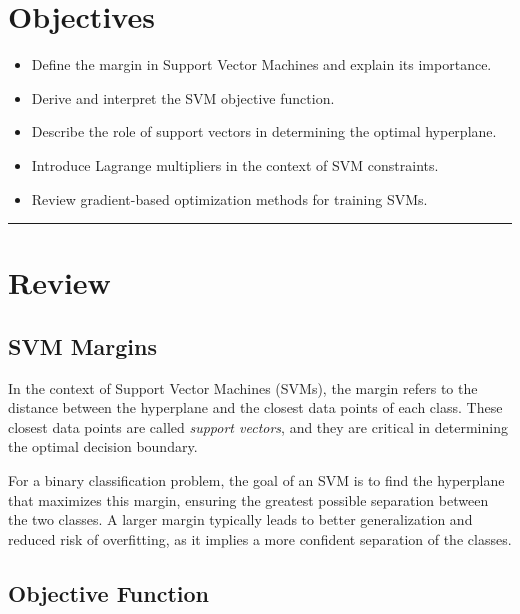 \section*{Objectives}
\begin{itemize}
    \item Define the margin in Support Vector Machines and explain its importance.
    \item Derive and interpret the SVM objective function.
    \item Describe the role of support vectors in determining the optimal hyperplane.
    \item Introduce Lagrange multipliers in the context of SVM constraints.
    \item Review gradient-based optimization methods for training SVMs.
\end{itemize}


\rule[0.0051in]{\textwidth}{0.00025in}

\section{Review}
\subsection{SVM Margins}

In the context of Support Vector Machines (SVMs), the margin refers to the distance between the hyperplane and the closest data points of each class. These closest data points are called \textit{support vectors}, and they are critical in determining the optimal decision boundary.

For a binary classification problem, the goal of an SVM is to find the hyperplane that maximizes this margin, ensuring the greatest possible separation between the two classes. A larger margin typically leads to better generalization and reduced risk of overfitting, as it implies a more confident separation of the classes.

\subsection{Objective Function}

